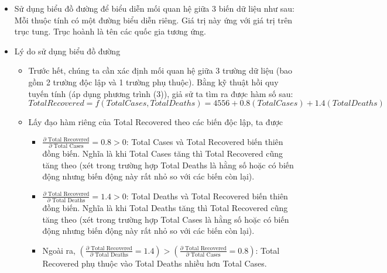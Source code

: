 \documentclass[a4paper, 12pt]{article}
\begin{document}
\begin{itemize}
        \item Sử dụng biểu đồ đường để biểu diễn mối quan hệ giữa 3 biến dữ liệu như sau: Mỗi thuộc tính có một đường biểu diễn riêng. Giá trị này ứng với giá trị trên trục tung. Trục hoành là tên các quốc gia tương ứng.
        \item Lý do sử dụng biểu đồ đường
        \begin{itemize}
            \item Trước hết, chúng ta cần xác định mối quan hệ giữa 3 trường dữ liệu (bao gồm 2 trường độc lập và 1 trường phụ thuộc). Bằng kỹ thuật hồi quy tuyến tính (áp dụng phương trình (3)), giả sử ta tìm ra được hàm số sau:
            $$Total Recovered = f(Total Cases, Total Deaths) = 4556 + 0.8(Total Cases) + 1.4(Total Deaths)$$
            \item Lấy đạo hàm riêng của Total Recovered theo các biến độc lập, ta được
            \begin{itemize}
                \item $\frac{\partial{\text{ Total Recovered}}}{\partial{\text{ Total Cases}}} = 0.8 > 0$: Total Cases và Total Recovered biến thiên đồng biến. Nghĩa là khi Total Cases tăng thì Total Recovered cũng tăng theo (xét trong trường hợp Total Deaths là hằng số hoặc có biến động nhưng biến động này rất nhỏ so với các biến còn lại).
                \item $\frac{\partial{\text{ Total Recovered}}}{\partial{\text{ Total Deaths}}} = 1.4 > 0$: Total Deaths và Total Recovered biến thiên đồng biến. Nghĩa là khi Total Deaths tăng thì Total Recovered cũng tăng theo (xét trong trường hợp Total Cases là hằng số hoặc có biến động nhưng biến động này rất nhỏ so với các biến còn lại).
                \item Ngoài ra, $(\frac{\partial{\text{ Total Recovered}}}{\partial{\text{ Total Deaths}}} = 1.4) > (\frac{\partial{\text{ Total Recovered}}}{\partial{\text{ Total Cases}}} = 0.8)$: Total Recovered phụ thuộc vào Total Deaths nhiều hơn Total Cases.
            \end{itemize}


\end{itemize}
\end{itemize}
\end{document}
